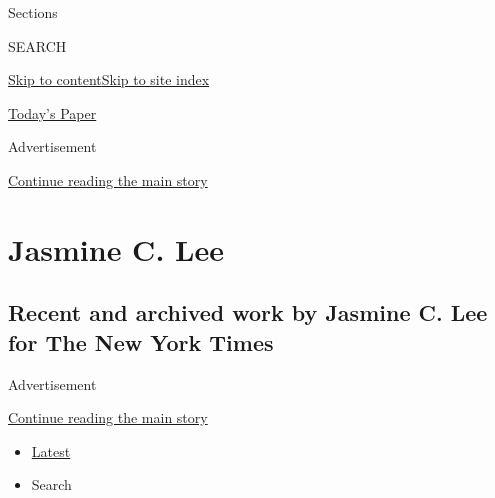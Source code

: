 Sections

SEARCH

\protect\hyperlink{site-content}{Skip to
content}\protect\hyperlink{site-index}{Skip to site index}

\href{https://myaccount.nytimes.com/auth/login?response_type=cookie\&client_id=vi}{}

\href{https://www.nytimes.com/section/todayspaper}{Today's Paper}

Advertisement

\protect\hyperlink{after-top}{Continue reading the main story}

\hypertarget{jasmine-c-lee}{%
\section{Jasmine C. Lee}\label{jasmine-c-lee}}

\hypertarget{recent-and-archived-work-by-jasmine-c-lee-for-the-new-york-times}{%
\subsection{Recent and archived work by Jasmine C. Lee for The New York
Times}\label{recent-and-archived-work-by-jasmine-c-lee-for-the-new-york-times}}

Advertisement

\protect\hyperlink{after-mid1}{Continue reading the main story}

\begin{itemize}
\tightlist
\item
  \protect\hyperlink{stream-panel}{Latest}
\item
  Search
\end{itemize}

